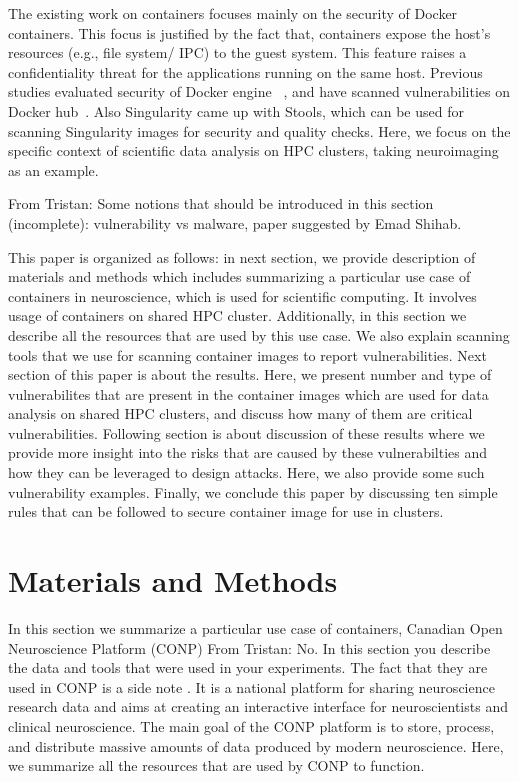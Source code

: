 \documentclass[a4paper,num-refs]{oup-contemporary}
\newcommand{\TG}[1]{\color{blue}From Tristan: #1 \color{black}}
\begin{document}
The existing work on containers focuses mainly on the security of Docker
containers.
This focus is justified by the fact that, containers expose the host's resources
(e.g., file system/ IPC) to the guest system. This feature raises a confidentiality
threat for the applications running on the same host. Previous studies evaluated
security of Docker engine ~\cite{martin2018docker, sultan2019container, combe2016docker, bui2015analysis},
and have scanned vulnerabilities on Docker hub~\cite{Shu2017, gummaraju2015over}.
Also Singularity came up with Stools, which can be used for scanning Singularity images
for security and quality checks.
Here, we focus on the specific context of scientific data analysis on HPC clusters, taking
neuroimaging as an example.

\TG{Some notions that should be introduced in this section (incomplete):
vulnerability vs malware, paper suggested by Emad Shihab.}

This paper is organized as follows: in next section, we provide description
of materials and methods which includes summarizing a particular use case of
containers in neuroscience, which is used for scientific computing. It involves
usage of containers on shared HPC cluster. Additionally, in this section we
describe all the resources that are used by this use case. We also explain
scanning tools that we use for scanning container images to report
vulnerabilities. Next section of this paper is about the results. Here, we
present number and type of vulnerabilites that are present in the container images
which are used for data analysis on shared HPC clusters, and discuss how many of them are
critical vulnerabilities. Following section is about discussion of these results
where we provide more insight into the risks that are caused by these vulnerabilties
and how they can be leveraged to design attacks. Here, we also provide some such
vulnerability examples. Finally, we conclude this paper by discussing ten simple
rules that can be followed to secure container image for use in clusters.

\section{Materials and Methods}

In this section we summarize a particular use case of containers, Canadian
Open Neuroscience Platform (CONP) \TG{No. In this section you describe the data and tools 
that were used in your experiments. The fact that they are used in CONP 
is a side note}. It is a national platform for sharing neuroscience
research data and aims at creating an interactive interface for neuroscientists and
clinical neuroscience. The main goal of the CONP platform is to store, process, and
distribute massive amounts of data produced by modern neuroscience.
Here, we summarize all the resources that are
used by CONP to function.
\end{document}

